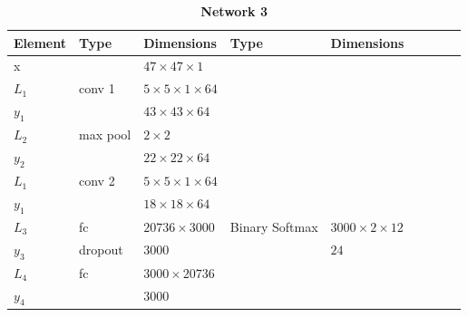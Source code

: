 \begin{table}[h!]
\centering
\caption*{{\bf \large Network 3}}
{\footnotesize
\begin{tabular}{|lllllllll|}
\hline
\multicolumn{1}{|l|}{Element} & Type     & \multicolumn{1}{l|}{Dimensions}                     & Type     & \multicolumn{1}{l|}{Dimensions}  \\ \hline
\multicolumn{1}{|l|}{x}       &          & \multicolumn{1}{l|}{$47\times47\times1$}            &          & \multicolumn{1}{l|}{}        \\ \hline

\multicolumn{1}{|l|}{$L_1$}   & conv 1   & \multicolumn{1}{l|}{$5\times 5\times1\times 64$}    &          & \multicolumn{1}{l|}{}\\
\multicolumn{1}{|l|}{$y_1$}   &          & \multicolumn{1}{l|}{$43\times43\times64$}           &          & \multicolumn{1}{l|}{}        \\ \hline

\multicolumn{1}{|l|}{$L_2$}   & max pool & \multicolumn{1}{l|}{$2\times 2$}                    &          & \multicolumn{1}{l|}{}        \\
\multicolumn{1}{|l|}{$y_2$}   &          & \multicolumn{1}{l|}{$22\times22\times 64$}          &          & \multicolumn{1}{l|}{}        \\ \hline

\multicolumn{1}{|l|}{$L_1$}   & conv 2   & \multicolumn{1}{l|}{$5\times 5\times1\times 64$}    &          & \multicolumn{1}{l|}{}\\
\multicolumn{1}{|l|}{$y_1$}   &          & \multicolumn{1}{l|}{$18\times18\times64$}           &          & \multicolumn{1}{l|}{}        \\ \hline

\multicolumn{1}{|l|}{$L_3$}   & fc       & \multicolumn{1}{l|}{$20736\times3000$}              & Binary Softmax & \multicolumn{1}{l|}{$3000\times2\times12$}        \\
\multicolumn{1}{|l|}{$y_3$}   & dropout  & \multicolumn{1}{l|}{$3000$}                         &          & \multicolumn{1}{l|}{$24$}        \\ \hline

\multicolumn{1}{|l|}{$L_4$}   & fc       & \multicolumn{1}{l|}{$3000\times20736$}              &          & \multicolumn{1}{l|}{}        \\
\multicolumn{1}{|l|}{$y_4$}   &          & \multicolumn{1}{l|}{$3000$}                         &          & \multicolumn{1}{l|}{}        \\ \hline


\end{tabular}}
\end{table}
